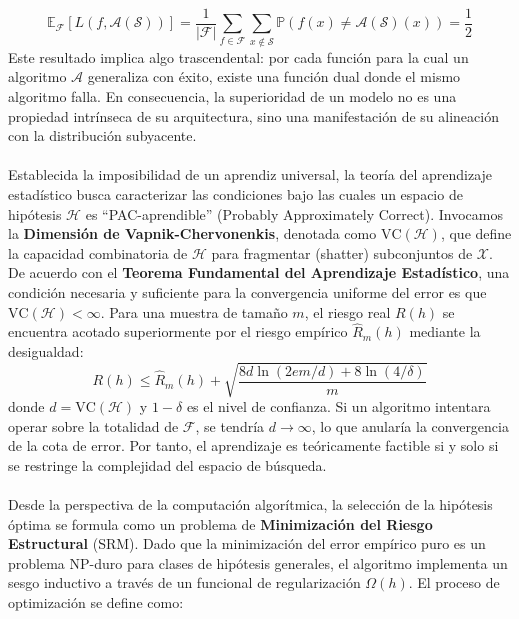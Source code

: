 \documentclass{article}
\begin{document}
\begin{equation}[H]
\mathbb{E}_{\mathcal{F}} [L(f, \mathcal{A}(\mathcal{S}))] = \frac{1}{|\mathcal{F}|} \sum_{f \in \mathcal{F}} \sum_{x \notin \mathcal{S}} \mathbb{P}(f(x) \neq \mathcal{A}(\mathcal{S})(x)) = \frac{1}{2}
\end{equation}
Este resultado implica algo trascendental: por cada función para la cual un algoritmo $\mathcal{A}$ generaliza con éxito, existe una función dual donde el mismo algoritmo falla. En consecuencia, la superioridad de un modelo no es una propiedad intrínseca de su arquitectura, sino una manifestación de su alineación con la distribución subyacente. \\ \\
Establecida la imposibilidad de un aprendiz universal, la teoría del aprendizaje estadístico busca caracterizar las condiciones bajo las cuales un espacio de hipótesis $\mathcal{H}$ es ``PAC-aprendible'' (Probably Approximately Correct). Invocamos la \textbf{Dimensión de Vapnik-Chervonenkis}, denotada como $\text{VC}(\mathcal{H})$, que define la capacidad combinatoria de $\mathcal{H}$ para fragmentar (shatter) subconjuntos de $\mathcal{X}$. De acuerdo con el \textbf{Teorema Fundamental del Aprendizaje Estadístico}, una condición necesaria y suficiente para la convergencia uniforme del error es que $\text{VC}(\mathcal{H}) < \infty$. Para una muestra de tamaño $m$, el riesgo real $R(h)$ se encuentra acotado superiormente por el riesgo empírico $\hat{R}_m(h)$ mediante la desigualdad:
\begin{equation}[H]
R(h) \leq \hat{R}_m(h) + \sqrt{\frac{8 d \ln(2em/d) + 8 \ln(4/\delta)}{m}}
\end{equation}
\noindent donde $d = \text{VC}(\mathcal{H})$ y $1-\delta$ es el nivel de confianza. Si un algoritmo intentara operar sobre la totalidad de $\mathcal{F}$, se tendría $d \to \infty$, lo que anularía la convergencia de la cota de error. Por tanto, el aprendizaje es teóricamente factible si y solo si se restringe la complejidad del espacio de búsqueda. \\ \\
Desde la perspectiva de la computación algorítmica, la selección de la hipótesis óptima se formula como un problema de \textbf{Minimización del Riesgo Estructural} (SRM). Dado que la minimización del error empírico puro es un problema NP-duro para clases de hipótesis generales, el algoritmo implementa un sesgo inductivo a través de un funcional de regularización $\Omega(h)$. El proceso de optimización se define como:
\end{document}

